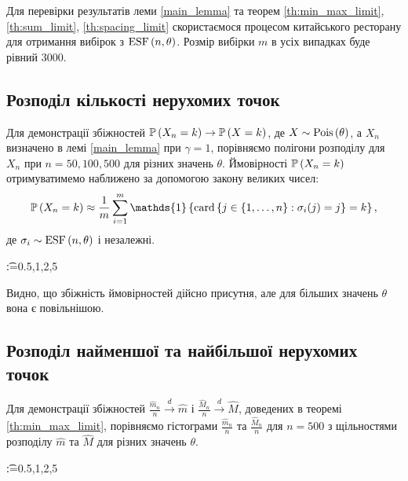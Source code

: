 Для перевірки результатів леми \ref{main_lemma} та теорем
\ref{th:min_max_limit}, \ref{th:sum_limit}, \ref{th:spacing_limit}
скористаємося процесом китайського ресторану для отримання вибірок
з $\ESF{n, \theta}$. Розмір вибірки $m$ в усіх випадках буде рівний 3000.

\subsection{Розподіл кількості нерухомих точок}
Для демонстрації збіжностей
$\P{X_n = k} \to \P{X = k}$, де $X \sim \Poiss{\theta}$,
а $X_n$ визначено в лемі \ref{main_lemma} при $\gamma = 1$,
порівняємо полігони розподілу для $X_n$ при $n = 50, 100, 500$ для
різних значень $\theta$. Ймовірності $\P{X_n = k}$ отримуватимемо наближено
за допомогою закону великих чисел: 
\begin{gather*}
    \P{X_n = k} \approx \frac{1}{m} \sum_{i=1}^m \mathds{1}\left\{ 
        \card\left\{j\in \left\{1,\dots,n\right\} : \sigma_i(j) = j\right\} = k
    \right\},
\end{gather*}
де $\sigma_i \sim \ESF{n, \theta}$ і незалежні.

\makeatletter
    \@for\t:={0.5,1,2,5}
\makeatother

Видно, що збіжність ймовірностей дійсно присутня, але для більших
значень $\theta$ вона є повільнішою.

\subsection{Розподіл найменшої та найбільшої нерухомих точок}
Для демонстрації збіжностей
$\frac{\widehat{m}_n}{n} \overset{d}{\longrightarrow} \widehat{m}$ і
$\frac{\widehat{M}_n}{n} \overset{d}{\longrightarrow} \widehat{M}$,
доведених в теоремі \ref{th:min_max_limit}, порівняємо
гістограми $\frac{\widehat{m}_n}{n}$ та $\frac{\widehat{M}_n}{n}$
для $n = 500$ з щільностями розподілу $\widehat{m}$ та $\widehat{M}$
для різних значень $\theta$.

\makeatletter
    \@for\t:={0.5,1,2,5}
\makeatother


